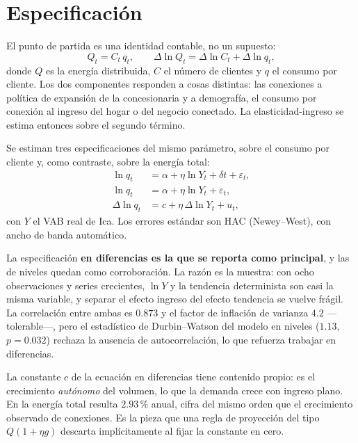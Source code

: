\documentclass[11pt,a4paper]{article}
\begin{document}
\section{Especificación}

El punto de partida es una identidad contable, no un supuesto:
\begin{equation}
Q_t = C_t\,q_t,
\qquad
\Delta \ln Q_t = \Delta \ln C_t + \Delta \ln q_t,
\end{equation}
donde $Q$ es la energía distribuida, $C$ el número de clientes y $q$ el consumo
por cliente. Los dos componentes responden a cosas distintas: las conexiones a
política de expansión de la concesionaria y a demografía, el consumo por
conexión al ingreso del hogar o del negocio conectado. La elasticidad-ingreso se
estima entonces sobre el segundo término.

Se estiman tres especificaciones del mismo parámetro, sobre el consumo por
cliente y, como contraste, sobre la energía total:
\begin{align}
\ln q_t &= \alpha + \eta \ln Y_t + \delta t + \varepsilon_t, \\
\ln q_t &= \alpha + \eta \ln Y_t + \varepsilon_t, \\
\Delta \ln q_t &= c + \eta\, \Delta \ln Y_t + u_t,
\end{align}
con $Y$ el VAB real de Ica. Los errores estándar son HAC (Newey--West), con
ancho de banda automático.

La especificación \textbf{en diferencias es la que se reporta como principal}, y
las de niveles quedan como corroboración. La razón es la muestra: con ocho
observaciones y series crecientes, $\ln Y$ y la tendencia determinista son casi
la misma variable, y separar el efecto ingreso del efecto tendencia se vuelve
frágil. La correlación entre ambas es $0{.}873$ y el factor de inflación de
varianza $4{.}2$ ---tolerable---, pero el estadístico de Durbin--Watson del
modelo en niveles ($1{.}13$, $p = 0{.}032$) rechaza la ausencia de
autocorrelación, lo que refuerza trabajar en diferencias.

La constante $c$ de la ecuación en diferencias tiene contenido propio: es el
crecimiento \emph{autónomo} del volumen, lo que la demanda crece con ingreso
plano. En la energía total resulta $2{.}93$\,\% anual, cifra del mismo orden que
el crecimiento observado de conexiones. Es la pieza que una regla de proyección
del tipo $Q(1+\eta g)$ descarta implícitamente al fijar la constante en cero.
\end{document}
